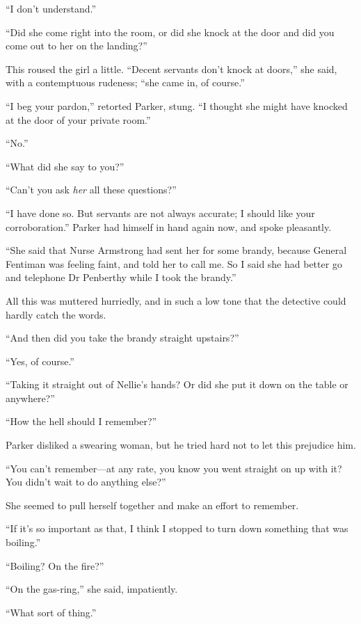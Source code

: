 \enquote{I don't understand.}

\enquote{Did she come right into the room, or did she knock at the door and did you come out to her on the landing?}

This roused the girl a little. \enquote{Decent servants don't knock at doors,} she said, with a contemptuous rudeness; \enquote{she came in, of course.}

\enquote{I beg your pardon,} retorted Parker, stung. \enquote{I thought she might have knocked at the door of your private room.}

\enquote{No.}

\enquote{What did she say to you?}

\enquote{Can't you ask \textit{her} all these questions?}

\enquote{I have done so. But servants are not always accurate; I should like your corroboration.} Parker had himself in hand again now, and spoke pleasantly.

\enquote{She said that Nurse Armstrong had sent her for some brandy, because General Fentiman was feeling faint, and told her to call me. So I said she had better go and telephone Dr Penberthy while I took the brandy.}

All this was muttered hurriedly, and in such a low tone that the detective could hardly catch the words.

\enquote{And then did you take the brandy straight upstairs?}

\enquote{Yes, of course.}

\enquote{Taking it straight out of Nellie's hands? Or did she put it down on the table or anywhere?}

\enquote{How the hell should I remember?}

Parker disliked a swearing woman, but he tried hard not to let this prejudice him.

\enquote{You can't remember\allowbreak---\allowbreak at any rate, you know you went straight on up with it? You didn't wait to do anything else?}

She seemed to pull herself together and make an effort to remember.

\enquote{If it's so important as that, I think I stopped to turn down something that was boiling.}

\enquote{Boiling? On the fire?}

\enquote{On the gas-ring,} she said, impatiently.

\enquote{What sort of thing.}

